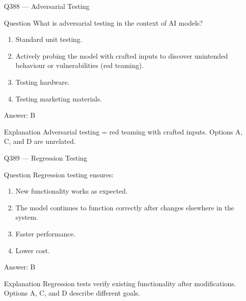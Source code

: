 \documentclass[aspectratio=169,8pt]{beamer}
\begin{document}
	\begin{frame}{Q388 --- Adversarial Testing}
		\begin{block}{Question}
			What is adversarial testing in the context of AI models?
			\begin{enumerate}
				\item Standard unit testing.
				\item Actively probing the model with crafted inputs to discover unintended behaviour or vulnerabilities (red teaming).
				\item Testing hardware.
				\item Testing marketing materials.
			\end{enumerate}
		\end{block}
		\begin{exampleblock}{Answer: B}\end{exampleblock}
		\begin{block}{Explanation}
			Adversarial testing = red teaming with crafted inputs. Options A, C, and D are unrelated.
		\end{block}
	\end{frame}
	
	\begin{frame}{Q389 --- Regression Testing}
		\begin{block}{Question}
			Regression testing ensures:
			\begin{enumerate}
				\item New functionality works as expected.
				\item The model continues to function correctly after changes elsewhere in the system.
				\item Faster performance.
				\item Lower cost.
			\end{enumerate}
		\end{block}
		\begin{exampleblock}{Answer: B}\end{exampleblock}
		\begin{block}{Explanation}
			Regression tests verify existing functionality after modifications. Options A, C, and D describe different goals.
		\end{block}
	\end{frame}
	
\end{document}
